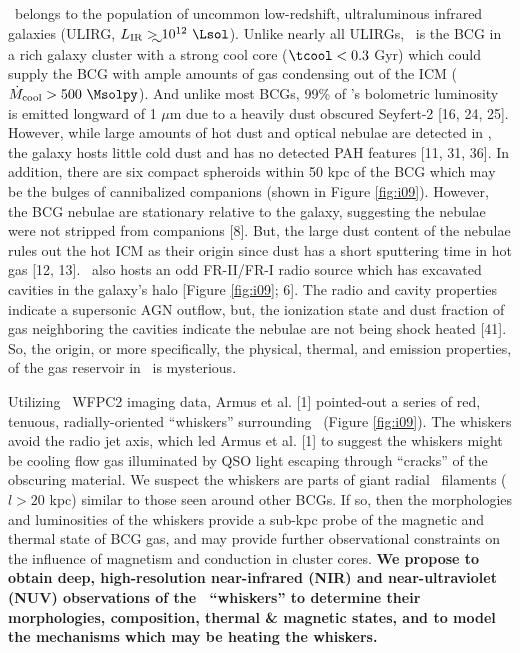 \documentclass[12pt]{article}
\begin{document}
\irs\ belongs to the population of uncommon low-redshift,
ultraluminous infrared galaxies (ULIRG, $L_{\mathrm{IR}} \ga 10^{12}
~\Lsol$). Unlike nearly all ULIRGs, \irs\ is the BCG in a rich galaxy
cluster with a strong cool core ($\tcool < 0.3$ Gyr) which could
supply the BCG with ample amounts of gas condensing out of the ICM
($\dot{M}_{\mathrm{cool}} > 500 ~\Msolpy$). And unlike most BCGs, 99\%
of \irs's bolometric luminosity is emitted longward of 1 $\mu$m due to
a heavily dust obscured Seyfert-2 [16, 24, 25]. However, while large
amounts of hot dust and optical nebulae are detected in \irs, the
galaxy hosts little cold dust and has no detected PAH features [11,
  31, 36]. In addition, there are six compact spheroids within 50 kpc
of the BCG which may be the bulges of cannibalized companions (shown
in Figure \ref{fig:i09}). However, the BCG nebulae are stationary
relative to the galaxy, suggesting the nebulae were not stripped from
companions [8]. But, the large dust content of the nebulae rules out
the hot ICM as their origin since dust has a short sputtering time in
hot gas [12, 13]. \irs\ also hosts an odd FR-II/FR-I radio source
which has excavated cavities in the galaxy's halo [Figure
  \ref{fig:i09}; 6]. The radio and cavity properties indicate a
supersonic AGN outflow, but, the ionization state and dust fraction of
gas neighboring the cavities indicate the nebulae are not being shock
heated [41]. So, the origin, or more specifically, the physical,
thermal, and emission properties, of the gas reservoir in \irs\ is
mysterious.

Utilizing \hst\ WFPC2 imaging data, Armus et al. [1] pointed-out a
series of red, tenuous, radially-oriented ``whiskers'' surrounding
\irs\ (Figure \ref{fig:i09}). The whiskers avoid the radio jet axis,
which led Armus et al. [1] to suggest the whiskers might be cooling
flow gas illuminated by QSO light escaping through ``cracks'' of the
obscuring material. We suspect the whiskers are parts of giant radial
\halpha\ filaments ($l > 20$ kpc) similar to those seen around other
BCGs. If so, then the morphologies and luminosities of the whiskers
provide a sub-kpc probe of the magnetic and thermal state of BCG gas,
and may provide further observational constraints on the influence of
magnetism and conduction in cluster cores. {\bf{We propose to obtain
    deep, high-resolution near-infrared (NIR) and near-ultraviolet
    (NUV) observations of the \iras\ ``whiskers'' to determine their
    morphologies, composition, thermal \& magnetic states, and to
    model the mechanisms which may be heating the whiskers.}}
\end{document}

